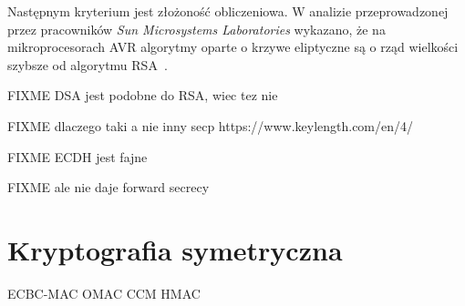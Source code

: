 Następnym kryterium jest złożoność obliczeniowa. W analizie przeprowadzonej przez pracowników \emph{Sun Microsystems Laboratories} wykazano, że na mikroprocesorach AVR algorytmy oparte o krzywe eliptyczne są o rząd wielkości szybsze od algorytmu RSA~\cite{Gura2004}.

FIXME
DSA jest podobne do RSA, wiec tez nie

FIXME
dlaczego taki a nie inny secp
https://www.keylength.com/en/4/

FIXME
ECDH jest fajne

FIXME
ale nie daje forward secrecy



\section{Kryptografia symetryczna}
\label{sec:kryptoSym}

ECBC-MAC
OMAC
CCM
HMAC
